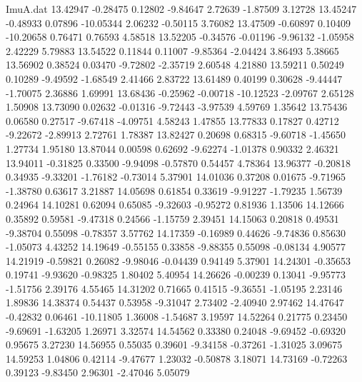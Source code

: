 \begin{filecontents}{ImuA.dat}
  13.42947   -0.28475    0.12802   -9.84647    2.72639   -1.87509    3.12728
  13.45247   -0.48933    0.07896  -10.05344    2.06232   -0.50115    3.76082
  13.47509   -0.60897    0.10409  -10.20658    0.76471    0.76593    4.58518
  13.52205   -0.34576   -0.01196   -9.96132   -1.05958    2.42229    5.79883
  13.54522    0.11844    0.11007   -9.85364   -2.04424    3.86493    5.38665
  13.56902    0.38524    0.03470   -9.72802   -2.35719    2.60548    4.21880
  13.59211    0.50249    0.10289   -9.49592   -1.68549    2.41466    2.83722
  13.61489    0.40199    0.30628   -9.44447   -1.70075    2.36886    1.69991
  13.68436   -0.25962   -0.00718  -10.12523   -2.09767    2.65128    1.50908
  13.73090    0.02632   -0.01316   -9.72443   -3.97539    4.59769    1.35642
  13.75436    0.06580    0.27517   -9.67418   -4.09751    4.58243    1.47855
  13.77833    0.17827    0.42712   -9.22672   -2.89913    2.72761    1.78387
  13.82427    0.20698    0.68315   -9.60718   -1.45650    1.27734    1.95180
  13.87044    0.00598    0.62692   -9.62274   -1.01378    0.90332    2.46321
  13.94011   -0.31825    0.33500   -9.94098   -0.57870    0.54457    4.78364
  13.96377   -0.20818    0.34935   -9.33201   -1.76182   -0.73014    5.37901
  14.01036    0.37208    0.01675   -9.71965   -1.38780    0.63617    3.21887
  14.05698    0.61854    0.33619   -9.91227   -1.79235    1.56739    0.24964
  14.10281    0.62094    0.65085   -9.32603   -0.95272    0.81936    1.13506
  14.12666    0.35892    0.59581   -9.47318    0.24566   -1.15759    2.39451
  14.15063    0.20818    0.49531   -9.38704    0.55098   -0.78357    3.57762
  14.17359   -0.16989    0.44626   -9.74836    0.85630   -1.05073    4.43252
  14.19649   -0.55155    0.33858   -9.88355    0.55098   -0.08134    4.90577
  14.21919   -0.59821    0.26082   -9.98046   -0.04439    0.94149    5.37901
  14.24301   -0.35653    0.19741   -9.93620   -0.98325    1.80402    5.40954
  14.26626   -0.00239    0.13041   -9.95773   -1.51756    2.39176    4.55465
  14.31202    0.71665    0.41515   -9.36551   -1.05195    2.23146    1.89836
  14.38374    0.54437    0.53958   -9.31047    2.73402   -2.40940    2.97462
  14.47647   -0.42832    0.06461  -10.11805    1.36008   -1.54687    3.19597
  14.52264    0.21775    0.23450   -9.69691   -1.63205    1.26971    3.32574
  14.54562    0.33380    0.24048   -9.69452   -0.69320    0.95675    3.27230
  14.56955    0.55035    0.39601   -9.34158   -0.37261   -1.31025    3.09675
  14.59253    1.04806    0.42114   -9.47677    1.23032   -0.50878    3.18071
  14.73169   -0.72263    0.39123   -9.83450    2.96301   -2.47046    5.05079

\end{filecontents}
